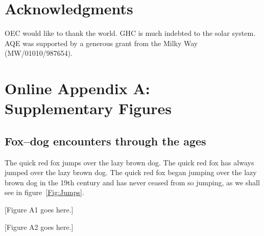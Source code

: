 \documentclass[11pt]{article}
\begin{document}

\section*{Acknowledgments}

OEC would like to thank the world. GHC is much indebted to 
the solar system. AQE was supported by a generous grant from 
the Milky Way (MW/01010/987654).

\newpage{}

\renewcommand{\thesection}{\Alph{section}}

\section*{Online Appendix A: Supplementary Figures}


\renewcommand{\theequation}{A\arabic{equation}}
\renewcommand{\thetable}{A\arabic{table}}
\setcounter{equation}{0}  %
\setcounter{figure}{0}
\setcounter{table}{0}

\subsection*{Fox--dog encounters through the ages}

The quick red fox jumps over the lazy brown dog. The quick red fox has 
always jumped over the lazy brown dog. The quick red fox began jumping 
over the lazy brown dog in the 19th century and has never ceased from so 
jumping, as we shall see in figure~\ref{Fig:Jumps}.

[Figure A1 goes here.]

[Figure A2 goes here.]
\end{document}
